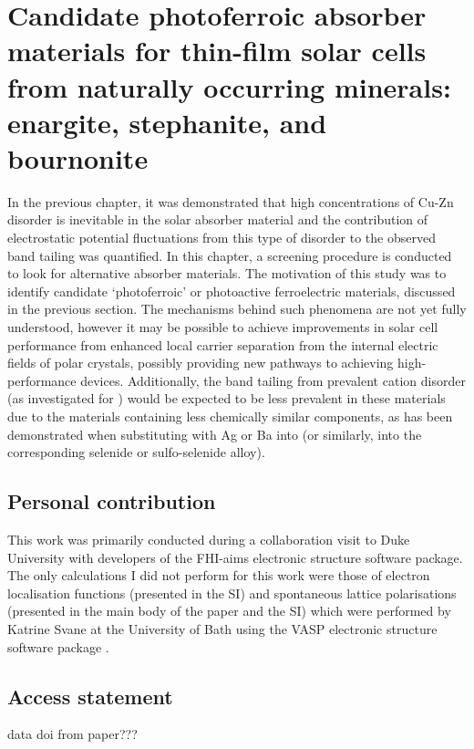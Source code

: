 \documentclass[11pt, twoside]{report}
\begin{document}
\section{Candidate photoferroic absorber materials for thin-film
solar cells from naturally occurring minerals:
enargite, stephanite, and bournonite}\label{sulfosalts1}


In the previous chapter, it was demonstrated that high concentrations of Cu-Zn disorder is inevitable in the solar absorber material {\CZTS} and the contribution of electrostatic potential fluctuations from this type of disorder to the observed band tailing was quantified. In this chapter, a screening procedure is conducted to look for alternative absorber materials. The motivation of this study was to identify candidate `photoferroic' or photoactive ferroelectric materials, discussed in the previous section. The mechanisms behind such phenomena are not yet fully understood, however it may be possible to achieve improvements in solar cell performance from enhanced local carrier separation from the internal electric fields of polar crystals, possibly providing new pathways to achieving high-performance devices.
Additionally, the band tailing from prevalent cation disorder (as investigated for {\CZTS}) would be expected to be less prevalent in these materials due to the materials containing less chemically similar components, as has been demonstrated when substituting with Ag \cite{Gerschon_AZTSe} or Ba \cite{distant_cations, Tong_Ba-CZTS} into {\CZTS} (or similarly, into the corresponding selenide or sulfo-selenide alloy).

\subsection{Personal contribution}
This work was primarily conducted during a collaboration visit to Duke University with developers of the FHI-aims \cite{FHI-aims} electronic structure software package. The only calculations I did not perform for this work were those of electron localisation functions (presented in the SI) and spontaneous lattice polarisations (presented in the main body of the paper and the SI) which were performed by Katrine Svane at the University of Bath using the VASP electronic structure software package \cite{VASP}.

\subsection{Access statement}
data doi from paper???
\end{document}

